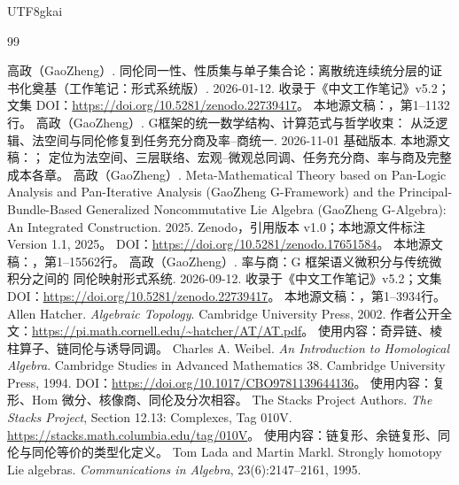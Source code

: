 \documentclass[12pt,a4paper,openany,notitlepage]{report}
\renewcommand{\bibname}{参考文献与原稿定位}
\theoremstyle{plain}
\theoremstyle{definition}
\theoremstyle{remark}
\begin{document}
\begin{CJK*}{UTF8}{gkai}
\clearpage
\begin{thebibliography}{99}
\addcontentsline{toc}{chapter}{\bibname}
\small
{}高政（GaoZheng）. 同伦同一性、性质集与单子集合论：离散统连续统分层的证书化奠基（工作笔记：形式系统版）. 2026-01-12.
\newblock 收录于《中文工作笔记》v5.2；文集 DOI：\url{https://doi.org/10.5281/zenodo.22739417}。
\newblock 本地源文稿：，第1--1132行。
高政（GaoZheng）. G框架的统一数学结构、计算范式与哲学收束：
从泛逻辑、法空间与同伦修复到任务充分商及率--商统一. 2026-11-01 基础版本.
\newblock 本地源文稿：；
定位为法空间、三层联络、宏观--微观总同调、任务充分商、率与商及完整成本各章。
高政（GaoZheng）. Meta-Mathematical Theory based on Pan-Logic Analysis and Pan-Iterative Analysis (GaoZheng G-Framework) and the Principal-Bundle-Based Generalized Noncommutative Lie Algebra (GaoZheng G-Algebra): An Integrated Construction. 2025.
\newblock Zenodo，引用版本 v1.0；本地源文件标注 Version 1.1, 2025。
\newblock DOI：\url{https://doi.org/10.5281/zenodo.17651584}。
\newblock 本地源文稿：，第1--15562行。
高政（GaoZheng）. 率与商：G 框架语义微积分与传统微积分之间的 同伦映射形式系统. 2026-09-12.
\newblock 收录于《中文工作笔记》v5.2；文集 DOI：\url{https://doi.org/10.5281/zenodo.22739417}。
\newblock 本地源文稿：，第1--3934行。
Allen Hatcher. \emph{Algebraic Topology}. Cambridge University Press, 2002.
\newblock 作者公开全文：\url{https://pi.math.cornell.edu/~hatcher/AT/AT.pdf}。
\newblock 使用内容：奇异链、棱柱算子、链同伦与诱导同调。
Charles A. Weibel. \emph{An Introduction to Homological Algebra}.
Cambridge Studies in Advanced Mathematics 38. Cambridge University Press, 1994.
\newblock DOI：\url{https://doi.org/10.1017/CBO9781139644136}。
\newblock 使用内容：复形、Hom 微分、核像商、同伦及分次相容。
The Stacks Project Authors. \emph{The Stacks Project}, Section 12.13:
Complexes, Tag 010V.
\newblock \url{https://stacks.math.columbia.edu/tag/010V}。
\newblock 使用内容：链复形、余链复形、同伦与同伦等价的类型化定义。
Tom Lada and Martin Markl. Strongly homotopy Lie algebras.
\emph{Communications in Algebra}, 23(6):2147--2161, 1995.

\end{thebibliography}
\end{CJK*}
\end{document}
